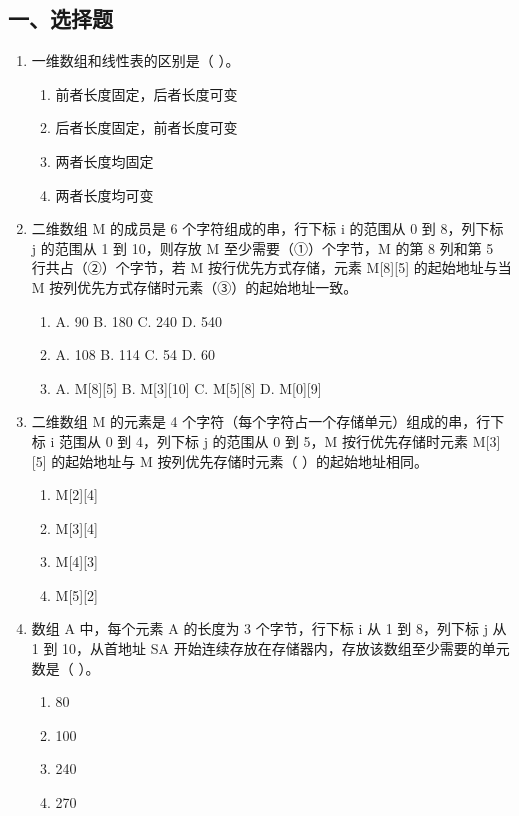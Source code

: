 \documentclass[12pt, a4paper]{article}
\begin{document}
\subsection*{一、选择题}
\begin{enumerate}
    \item 一维数组和线性表的区别是（ ）。
    \begin{enumerate}
        \item[A.] 前者长度固定，后者长度可变
        \item[B.] 后者长度固定，前者长度可变
        \item[C.] 两者长度均固定
        \item[D.] 两者长度均可变
    \end{enumerate}
    
    \item 二维数组 M 的成员是 6 个字符组成的串，行下标 i 的范围从 0 到 8，列下标 j 的范围从 1 到 10，则存放 M 至少需要（①）个字节，M 的第 8 列和第 5 行共占（②）个字节，若 M 按行优先方式存储，元素 M[8][5] 的起始地址与当 M 按列优先方式存储时元素（③）的起始地址一致。
    \begin{enumerate}
        \item[①] A. 90 \quad B. 180 \quad C. 240 \quad D. 540
        \item[②] A. 108 \quad B. 114 \quad C. 54 \quad D. 60
        \item[③] A. M[8][5] \quad B. M[3][10] \quad C. M[5][8] \quad D. M[0][9]
    \end{enumerate}
    
    \item 二维数组 M 的元素是 4 个字符（每个字符占一个存储单元）组成的串，行下标 i 范围从 0 到 4，列下标 j 的范围从 0 到 5，M 按行优先存储时元素 M[3][5] 的起始地址与 M 按列优先存储时元素（ ）的起始地址相同。
    \begin{enumerate}
        \item[A.] M[2][4]
        \item[B.] M[3][4]
        \item[C.] M[4][3]
        \item[D.] M[5][2]
    \end{enumerate}
    
    \item 数组 A 中，每个元素 A 的长度为 3 个字节，行下标 i 从 1 到 8，列下标 j 从 1 到 10，从首地址 SA 开始连续存放在存储器内，存放该数组至少需要的单元数是（ ）。
    \begin{enumerate}
        \item[A.] 80
        \item[B.] 100
        \item[C.] 240
        \item[D.] 270
    \end{enumerate}
    

\end{enumerate}
\end{document}
